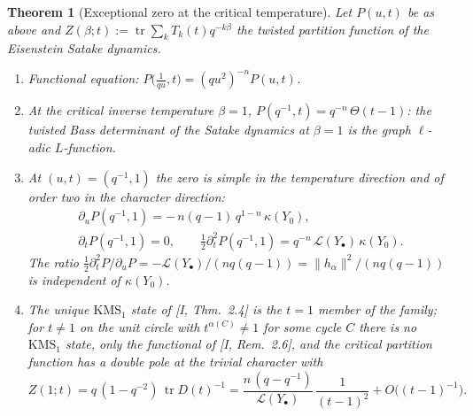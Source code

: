 \documentclass[11pt]{amsart}
\numberwithin{equation}{section}
\newtheorem{theorem}{Theorem}[section]
\theoremstyle{definition}
\theoremstyle{remark}
\newcommand{\cL}{\mathcal{L}}
\newcommand{\tr}{\operatorname{tr}}
\newcommand{\KMS}{\mathrm{KMS}}
\begin{document}
\begin{theorem}[Exceptional zero at the critical temperature]\label{thm:crit}
Let $P(u,t)$ be as above and $Z(\beta;t):=\tr\sum_kT_k(t)q^{-k\beta}$ the twisted
partition function of the Eisenstein Satake dynamics.
\begin{enumerate}
\item[(i)] Functional equation: $P\bigl(\tfrac1{qu},t\bigr)=(qu^{2})^{-n}P(u,t)$.
\item[(ii)] At the critical inverse temperature $\beta=1$,
$P(q^{-1},t)=q^{-n}\,\Theta(t-1)$: the twisted Bass determinant of the Satake dynamics
at $\beta=1$ is the graph $\ell$-adic $L$-function.
\item[(iii)] At $(u,t)=(q^{-1},1)$ the zero is simple in the temperature direction and
of order two in the character direction:
\begin{gather*}
\partial_uP(q^{-1},1)=-\,n(q-1)\,q^{1-n}\,\kappa(Y_0),\\
\partial_tP(q^{-1},1)=0,\qquad
\tfrac12\partial_t^{2}P(q^{-1},1)=q^{-n}\,\cL(Y_\bullet)\,\kappa(Y_0) .
\end{gather*}
The ratio $\tfrac12\partial_t^{2}P/\partial_uP=-\cL(Y_\bullet)/(nq(q-1))
=\|h_\alpha\|^{2}/(nq(q-1))$ is independent of $\kappa(Y_0)$.
\item[(iv)] The unique $\KMS_1$ state of {\rm[I, Thm.~2.4]} is the $t=1$ member of the
family; for $t\neq1$ on the unit circle with $t^{\alpha(C)}\neq1$ for some cycle $C$
there is no $\KMS_1$ state, only the functional of {\rm[I, Rem.~2.6]}, and the critical
partition function has a double pole at the trivial character with
\[
Z(1;t)=q\,(1-q^{-2})\,\tr D(t)^{-1}
=\frac{n\,(q-q^{-1})}{\cL(Y_\bullet)}\,\frac1{(t-1)^{2}}+O\bigl((t-1)^{-1}\bigr).
\]
\end{enumerate}
\end{theorem}
\end{document}
